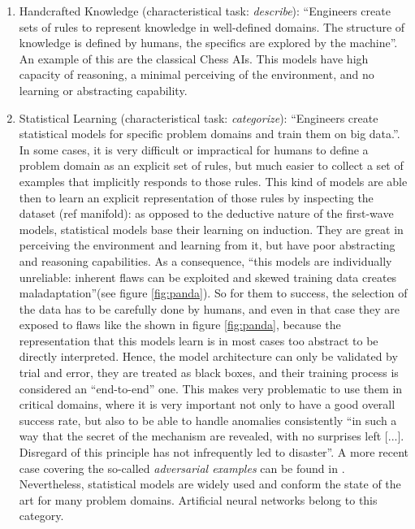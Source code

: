 \begin{enumerate}
\item Handcrafted Knowledge (characteristical task: {\it describe}): ``Engineers create sets of rules to represent knowledge in well-defined domains. The structure of knowledge is defined by humans, the specifics are explored by the machine''. An example of this are the classical Chess AIs. This models have high capacity of reasoning, a minimal perceiving of the environment, and no learning or abstracting capability.
\item Statistical Learning (characteristical task: {\it categorize}): ``Engineers create statistical models for specific problem domains and train them on big data.''. In some cases, it is very difficult or impractical for humans to define a problem domain as an explicit set of rules, but much easier to collect a set of examples that implicitly responds to those rules. This kind of models are able then to learn an explicit representation of those rules by inspecting the dataset (ref manifold): as opposed to the deductive nature of the first-wave models, statistical models base their learning on induction. They are great in perceiving the environment and learning from it, but have poor abstracting and reasoning capabilities. As a consequence, ``this models are individually unreliable: inherent flaws can be exploited and skewed training data creates maladaptation''(see figure \ref{fig:panda}). So for them to success, the selection of the data has to be carefully done by humans, and even in that case they are exposed to flaws like the shown in figure \ref{fig:panda}, because the representation that this models learn is in most cases too abstract to be directly interpreted. Hence, the model architecture can only be validated by trial and error, they are treated as black boxes, and their training process is considered an ``end-to-end'' one. This makes very problematic to use them in critical domains, where it is very important not only to have a good overall success rate, but also to be able to handle anomalies consistently ``in such a way that the secret of the mechanism are revealed, with no surprises left [...]. Disregard of this principle has not infrequently led to disaster''\cite[p.436]{controlsystems}. A more recent case covering the so-called {\it adversarial examples} can be found in \cite{adversarial}.\\
  Nevertheless, statistical models are widely used and conform the state of the art for many problem domains. Artificial neural networks belong to this category.

\end{enumerate}
